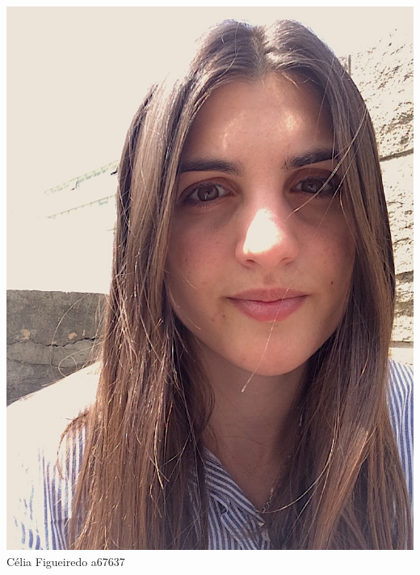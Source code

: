 \begin{titlepage}
\begin{center}
\noindent\begin{minipage}[b]{.2\textwidth}
	\includegraphics[scale=0.18]{celia}
	\small{Célia Figueiredo a67637}
\end{minipage} 
\hfill
\begin{minipage}[b]{.2\textwidth}

\end{minipage}
\end{center}
\end{titlepage}
